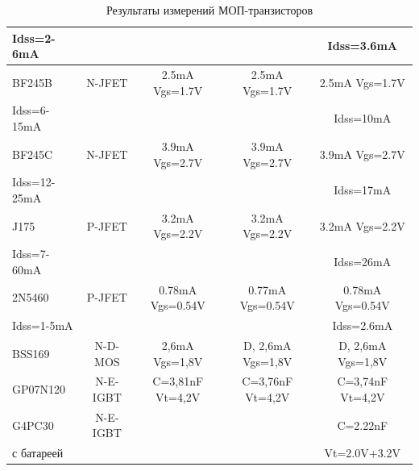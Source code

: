 \begin{table}[H]
\begin{center}
\begin{tabular}{| l | c | c | c | c |}
Idss=2-6mA   &         &                  &                  & Idss=3.6mA      \\
    \hline
BF245B       & N-JFET  & 2.5mA Vgs=1.7V   & 2.5mA Vgs=1.7V   & 2.5mA Vgs=1.7V \\
Idss=6-15mA  &         &                  &                  & Idss=10mA      \\
    \hline
BF245C       & N-JFET  & 3.9mA Vgs=2.7V   & 3.9mA Vgs=2.7V   & 3.9mA Vgs=2.7V \\
Idss=12-25mA &         &                  &                  & Idss=17mA    \\
    \hline
J175        & P-JFET   & 3.2mA Vgs=2.2V   & 3.2mA Vgs=2.2V   & 3.2mA Vgs=2.2V \\
Idss=7-60mA &          &                  &                  & Idss=26mA      \\
    \hline
2N5460      & P-JFET   & 0.78mA Vgs=0.54V & 0.77mA Vgs=0.54V & 0.78mA Vgs=0.54V \\
Idss=1-5mA  &          &                  &                  & Idss=2.6mA       \\
    \hline
BSS169      & N-D-MOS   & 2,6mA Vgs=1,8V & D, 2,6mA Vgs=1,8V & D, 2,6mA Vgs=1,8V \\
    \hline
GP07N120    & N-E-IGBT & C=3,81nF Vt=4,2V & C=3,76nF Vt=4,2V & C=3,74nF Vt=4,2V \\
    \hline
G4PC30      & N-E-IGBT &                  &                  & C=2.22nF         \\
с батареей  &          &                  &                  & Vt=2.0V+3.2V \\
    \hline
    \end{tabular}
  \end{center}
  \caption{Результаты измерений МОП-транзисторов}
  \label{tab:mos} 
\end{table}
